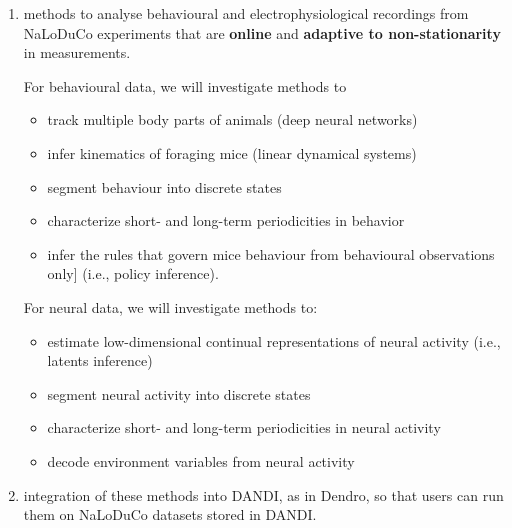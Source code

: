 \begin{enumerate}

    \item methods to analyse behavioural and electrophysiological recordings
    from NaLoDuCo experiments that are \textbf{online} and \textbf{adaptive to
    non-stationarity} in measurements.

    For behavioural data, we will investigate methods to

    \begin{itemize}

        \item track multiple body parts of animals (deep neural networks)

        \item infer kinematics of foraging mice (linear dynamical systems)

        \item segment behaviour into discrete states

        \item characterize short- and long-term periodicities in behavior

        \item infer the rules that govern mice behaviour from behavioural
        observations only] (i.e., policy inference).

    \end{itemize}

    For neural data, we will investigate methods to:
    \begin{itemize}

        \item estimate low-dimensional continual representations of neural
        activity (i.e., latents inference)

        \item segment neural activity into discrete states

        \item characterize short- and long-term periodicities in neural
            activity

        \item decode environment variables from neural activity

    \end{itemize}

    \item integration of these methods into DANDI, as in Dendro, so that users
    can run them on NaLoDuCo datasets stored in DANDI.

\end{enumerate}

